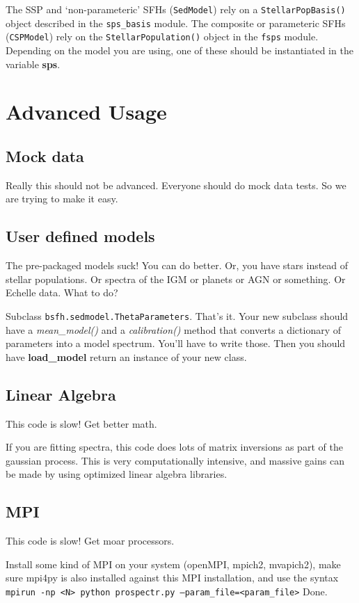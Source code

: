 \documentclass[12pt, letterpaper, preprint]{aastex}
\begin{document}
The SSP and `non-parameteric' SFHs (\texttt{SedModel}) rely on a
\texttt{StellarPopBasis()} object described in the \texttt{sps\_basis}
module.  The composite or parameteric SFHs (\texttt{CSPModel}) rely on
the \texttt{StellarPopulation()} object in the \texttt{fsps} module.
Depending on the model you are using, one of these should be
instantiated in the variable {\bf sps}.

\section{Advanced Usage}

\subsection{Mock data}
Really this should not be advanced.  Everyone should do mock data
tests.  So we are trying to make it easy.

\subsection{User defined models}
The pre-packaged models suck!  You can do better.  Or, you have stars
instead of stellar populations.  Or spectra of the IGM or planets or
AGN or something. Or Echelle data. What to do?

Subclass \texttt{bsfh.sedmodel.ThetaParameters}.  That's it.  Your new
subclass should have a {\it mean\_model()} and a {\it calibration()}
method that converts a dictionary of parameters into a model spectrum.
You'll have to write those.  Then you should have {\bf load\_model}
return an instance of your new class.

\subsection{Linear Algebra}
This code is slow!  Get better math.

If you are fitting spectra, this code does lots of matrix inversions
as part of the gaussian process.  This is very computationally
intensive, and massive gains can be made by using optimized linear
algebra libraries.

\subsection{MPI}
This code is slow!  Get moar processors.

Install some kind of MPI on your system (openMPI, mpich2, mvapich2),
make sure mpi4py is also installed against this MPI installation, and
use the syntax \texttt{mpirun -np <N> python prospectr.py
--param\_file=<param\_file>} Done.
\end{document}

